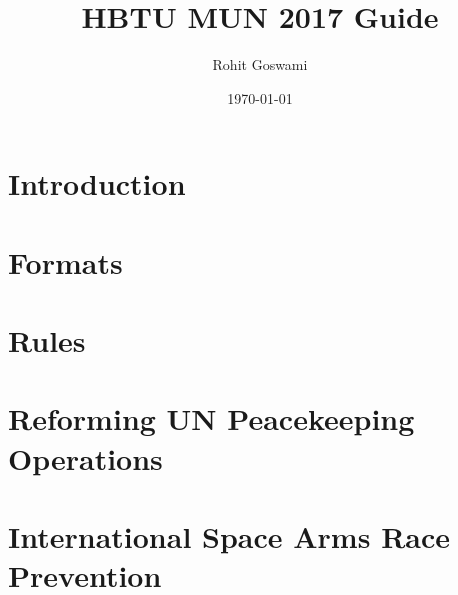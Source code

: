 \documentclass[11pt]{report}              %
\title{\bf HBTU MUN 2017 Guide}    %
\author{Rohit Goswami}              %
\date{\today}                           %
\begin{document}
\maketitle                              %
\tableofcontents                        %
\part{Introduction}                   %




\part{Formats}


\part{Rules}

\part{Reforming UN Peacekeeping Operations}

\part{International Space Arms Race Prevention}

\begin{appendices}
\end{appendices}
\printglossary
\end{document}

